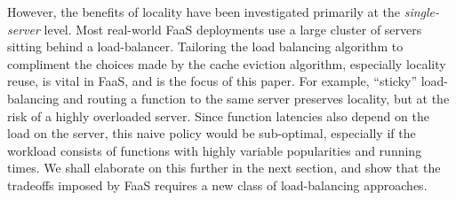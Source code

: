 However, the benefits of locality have been investigated primarily at the \emph{single-server} level.
Most real-world FaaS deployments use a large cluster of servers sitting behind a load-balancer.
Tailoring the load balancing algorithm to compliment the choices made by the cache eviction algorithm, especially locality reuse, is vital in FaaS, and is the focus of this paper.
For example, ``sticky'' load-balancing and routing a function to the same server preserves locality, but at the risk of a highly overloaded server.
Since function latencies also depend on the load on the server, this naive policy would be sub-optimal, especially if the workload consists of functions with highly variable popularities and running times.
We shall elaborate on this further in the next section, and show that the tradeoffs imposed by FaaS requires a new class of load-balancing approaches. 









\vspace*{-0.2cm}
